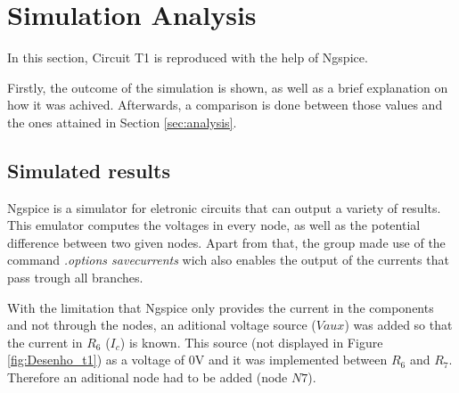 
\section{Simulation Analysis}
\label{sec:simulation}



In this section, Circuit T1 is reproduced with the help of Ngspice.

Firstly, the outcome of the simulation is shown, as well as a brief explanation
on how it was achived. Afterwards, a comparison is done between those values and
the ones attained in Section \ref{sec:analysis}.




\subsection{Simulated results}
\label{subsec:sim_res}



Ngspice is a simulator for eletronic circuits that can output a variety of results.
This emulator computes the voltages in every node, as well as the potential difference
between two given nodes. Apart from that, the group made use of the command
{\em .options savecurrents} wich also enables the output of the currents that pass
trough all branches.

With the limitation that Ngspice only provides the current in the components and not through
the nodes, an aditional voltage source ($Vaux$) was added so that the current in $R_6$ ($I_c$)
is known. This source (not displayed in Figure \ref{fig:Desenho_t1}) as a voltage of 0V and it 
was implemented between $R_6$ and $R_7$. Therefore an aditional node had to be added (node $N7$).

